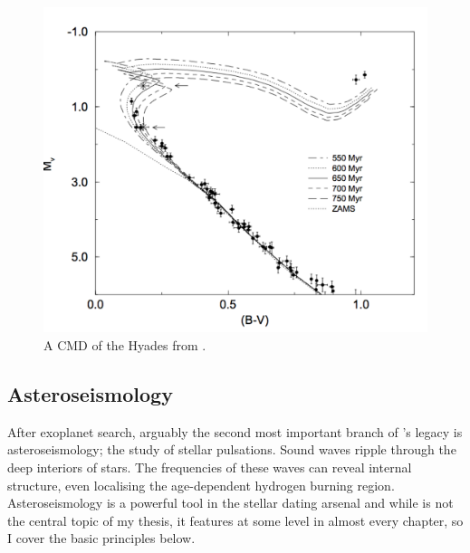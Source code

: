 \begin{figure}[p]
\begin{center}
\includegraphics[width=6in, clip=true]{figures/hyades.pdf}
\caption[A CMD of the Hyades from \citet{Perryman1988}.]
{A CMD of the Hyades from \citet{Perryman1988}.
}
\label{fig:hyades}
\end{center}
\end{figure}


\subsection{Asteroseismology}
\label{sec:asteroseismology}

After exoplanet search, arguably the second most important branch of \kepler's
legacy is asteroseismology; the study of stellar pulsations.
Sound waves ripple through the deep interiors of stars.
The frequencies of these waves can reveal internal structure, even localising
the age-dependent hydrogen burning region.
Asteroseismology is a powerful tool in the stellar dating arsenal and while is
not the central topic of my thesis, it features at some level in almost every
chapter, so I cover the basic principles below.

